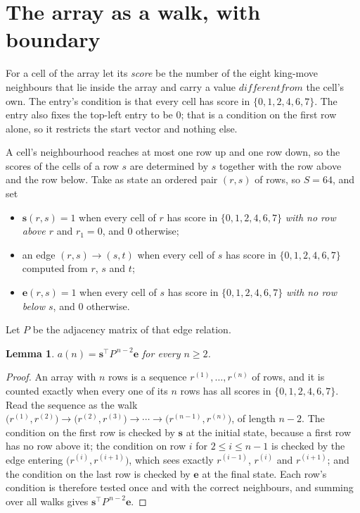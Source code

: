 \documentclass[11pt,a4paper]{article}
\theoremstyle{plain}
\newtheorem{lemma}[theorem]{Lemma}
\theoremstyle{definition}
\begin{document}
\section{The array as a walk, with boundary}

For a cell of the array let its \emph{score} be the number of the eight king-move neighbours that lie inside
the array and carry a value $different from$ the cell's own. The entry's condition is that every cell
has score in $\{0,1,2,4,6,7\}$. The entry also fixes the top-left entry to be $0$; that is a condition on the first row alone, so it restricts the start vector and nothing else.

A cell's neighbourhood reaches at most one row up and one row down, so the scores of the
cells of a row $s$ are determined by $s$ together with the row above and the row below.
Take as state an ordered pair $(r,s)$ of rows, so $S=64$, and set
\begin{itemize}
\item $\mathbf{s}(r,s)=1$ when every cell of $r$ has score in $\{0,1,2,4,6,7\}$ \emph{with no row
above $r$} and $r_1=0$, and $0$ otherwise;
\item an edge $(r,s)\to(s,t)$ when every cell of $s$ has score in $\{0,1,2,4,6,7\}$ computed from
$r$, $s$ and $t$;
\item $\mathbf{e}(r,s)=1$ when every cell of $s$ has score in $\{0,1,2,4,6,7\}$ \emph{with no row
below $s$}, and $0$ otherwise.
\end{itemize}
Let $P$ be the adjacency matrix of that edge relation.

\begin{lemma}\label{lem:walk}
$a(n)=\mathbf{s}^{\!\top}P^{\,n-2}\mathbf{e}$ for every $n\ge2$.
\end{lemma}

\begin{proof}
An array with $n$ rows is a sequence $r^{(1)},\dots,r^{(n)}$ of rows, and it is counted
exactly when every one of its $n$ rows has all scores in $\{0,1,2,4,6,7\}$. Read the sequence as the
walk $\bigl(r^{(1)},r^{(2)}\bigr)\to\bigl(r^{(2)},r^{(3)}\bigr)\to\cdots\to
\bigl(r^{(n-1)},r^{(n)}\bigr)$, of length $n-2$. The condition on the first row is
checked by $\mathbf{s}$ at the initial state, because a first row has no row above it; the
condition on row $i$ for $2\le i\le n-1$ is checked by the edge entering
$\bigl(r^{(i)},r^{(i+1)}\bigr)$, which sees exactly $r^{(i-1)}$, $r^{(i)}$ and
$r^{(i+1)}$; and the condition on the last row is checked by $\mathbf{e}$ at the final
state. Each row's condition is therefore tested once and with the correct neighbours, and
summing over all walks gives $\mathbf{s}^{\!\top}P^{\,n-2}\mathbf{e}$.
\end{proof}
\end{document}
